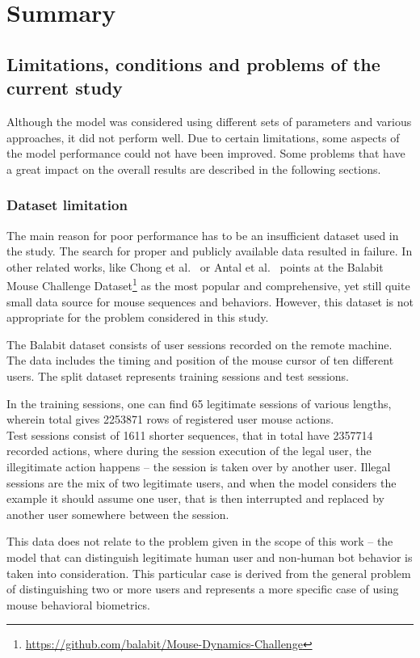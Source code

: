 \chapter{Summary}

\section{Limitations, conditions and problems of the current study}
Although the model was considered using different sets of parameters and various approaches, it did not perform well.
Due to certain limitations, some aspects of the model performance could not have been improved.
Some problems that have a great impact on the overall results are described in the following sections.

\subsection{Dataset limitation}
The main reason for poor performance has to be an insufficient dataset used in the study.
The search for proper and publicly available data resulted in failure.
In other related works, like Chong et al.~\cite{Main} or Antal et al.~\cite{balabit1} points at the Balabit Mouse Challenge Dataset\footnote{\url{https://github.com/balabit/Mouse-Dynamics-Challenge}} as the most popular and comprehensive, yet still quite small data source for mouse sequences and behaviors.
However, this dataset is not appropriate for the problem considered in this study.

The Balabit dataset consists of user sessions recorded on the remote machine. The data includes the timing and position of the mouse cursor of ten different users.
The split dataset represents training sessions and test sessions.

In the training sessions, one can find \num{65} legitimate sessions of various lengths, wherein total gives \num{2253871} rows of registered user mouse actions.\\
Test sessions consist of \num{1611} shorter sequences, that in total have \num{2357714} recorded actions, where during the session execution of the legal user, the illegitimate action happens – the session is taken over by another user. Illegal sessions are the mix of two legitimate users, and when the model considers the example it should assume one user, that is then interrupted and replaced by another user somewhere between the session.

This data does not relate to the problem given in the scope of this work – the model that can distinguish legitimate human user and non-human bot behavior is taken into consideration. This particular case is derived from the general problem of distinguishing two or more users and represents a more specific case of using mouse behavioral biometrics.

